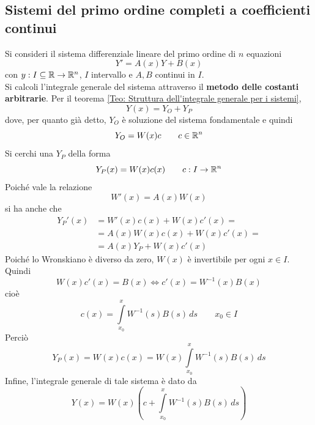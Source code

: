 \subsection{Sistemi del primo ordine completi a coefficienti continui}
Si consideri il sistema differenziale lineare del primo ordine di $n$ equazioni
\begin{equation*}
    Y'=A(x)Y+B(x)
\end{equation*}
con $y: I \subseteq \mathbb{R} \to \mathbb{R}^n$, $I$ intervallo e $A, B$ continui in $I$.\\
Si calcoli l'integrale generale del sistema attraverso il \textbf{metodo delle costanti arbitrarie}.
Per il teorema \ref{Teo: Struttura dell'integrale generale per i sistemi}, 
\begin{equation*}
    Y(x)=Y_O+Y_P
\end{equation*}
dove, per quanto già detto, $Y_O$ è soluzione del sistema fondamentale e quindi
\begin{equation*}
    Y_O=W(x)c \qquad c \in \mathbb{R}^n
\end{equation*}
Si cerchi una $Y_P$ della forma 
\begin{equation*}
    Y_P(x)=W(x)c(x) \qquad c:I\to \mathbb{R}^n
\end{equation*}
Poiché vale la relazione 
\begin{equation*}
    W'(x)=A(x)W(x)
\end{equation*}
si ha anche che
\begin{equation*}
\begin{aligned}
    Y_P'(x)&=W'(x)c(x)+W(x)c'(x)=\\
    &=A(x)W(x)c(x)+W(x)c'(x)=\\
    &=A(x)Y_P+W(x)c'(x)
\end{aligned}
\end{equation*}
Poiché lo Wronskiano è diverso da zero, $W(x)$ è invertibile per ogni $x \in I$. Quindi
\begin{equation*}
    W(x)c'(x) =B(x) \iff c'(x)=W^{-1}(x)B(x)
\end{equation*}
cioè
\begin{equation*}
    c(x)= \int\limits_{x_0}^{x}{W^{-1}(s)B(s)}\, ds \qquad x_0 \in I
\end{equation*}
Perciò
\begin{equation*}
Y_P(x)=W(x)c(x)=W(x) \int\limits_{x_0}^{x}{W^{-1}(s)B(s)}\, ds
\end{equation*}
Infine, l'integrale generale di tale sistema è dato da 
\begin{equation*}
    Y(x)=W(x)\left(c+ \int\limits_{x_0}^{x}{W^{-1}(s)B(s)}\, ds\right)
\end{equation*}
